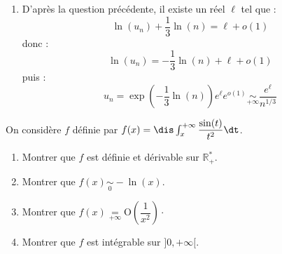 \documentclass[a4paper,10pt]{report}
\begin{document}
\begin{enumerate}
\item D'après la question précédente, il existe un réel $\ell$ tel que :
$$ \ln(u_n) + \dfrac{1}{3} \ln(n) = \ell + o(1)$$
donc :
$$ \ln(u_n) = - \dfrac{1}{3} \ln(n) + \ell + o(1)$$
puis :
$$ u_n = \exp \left( - \dfrac{1}{3} \ln(n) \right) e^{\ell} e^{o(1)} \underset{+ \infty}{\sim} \dfrac{e^{\ell}}{n^{1/3}}$$
\end{enumerate}

\begin{Exercice}{} On considère $f$ définie par $f(x)= \dis \int_x^{+ \infty} \dfrac{\sin(t)}{t^2} \dt$.
\begin{enumerate}
\item Montrer que $f$ est définie et dérivable sur $\mathbb{R}_+^{*}$.
\item Montrer que $f(x) \underset{0}{\sim} -\ln(x)$.
\item Montrer que $f(x) \underset{+ \infty}{=} \textrm{O} \left( \dfrac{1}{x^2} \right) \cdot$
\item Montrer que $f$ est intégrable sur $]0, + \infty[$.
\end{enumerate}
\end{Exercice}
\end{document}
